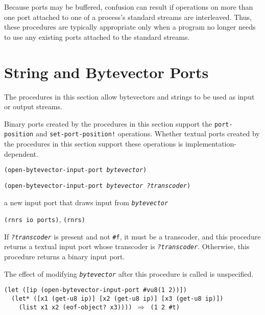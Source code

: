 Because ports may be buffered, confusion can result if operations on
more than one port attached to one of a process's standard streams are
interleaved.
Thus, these procedures are typically appropriate only when a program
no longer needs to use any existing ports attached to the standard
streams.



\section{\label{io_g125}\label{io_h4}String and Bytevector Ports\label{io_SECTSTRINGPORTS}}



The procedures in this section allow bytevectors and strings to be used
as input or output streams.


Binary ports created by the procedures in this section support
the \texttt{port-position} and \texttt{set-port-position!} operations.
Whether textual ports created by the procedures in this section support
these operations is implementation-dependent.

\begin{description}

\label{io_s34}\item[procedure] \texttt{(open-bytevector-input-port \textit{bytevector})}



\item[procedure] \texttt{(open-bytevector-input-port \textit{bytevector} \textit{?transcoder})}



\item[returns] a new input port that draws input from \texttt{\textit{bytevector}}


\item[libraries] \texttt{(rnrs io ports)}, \texttt{(rnrs)}
\end{description}


If \texttt{\textit{?transcoder}} is present and not \texttt{\#{}f}, it must be a
transcoder, and this procedure returns a textual input port
whose transcoder is \texttt{\textit{?transcoder}}.
Otherwise, this procedure returns a binary input port.


The effect of modifying \texttt{\textit{bytevector}} after this procedure is called
is unspecified.


\begin{alltt}
(let ([ip (open-bytevector-input-port \#{}vu8(1 2))])
  (let* ([x1 (get-u8 ip)] [x2 (get-u8 ip)] [x3 (get-u8 ip)])
    (list x1 x2 (eof-object? x3)))) \(\Rightarrow\) (1 2 \#{}t)
\end{alltt}


